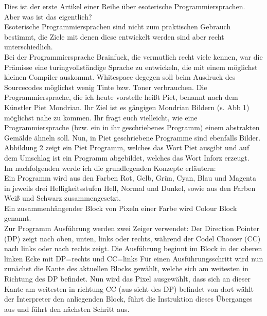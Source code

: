 {Dies ist der erste Artikel einer Reihe über esoterische Programmiersprachen.\\
Aber was ist das eigentlich?\\
Esoterische
Programmiersprachen sind nicht zum praktischen Gebrauch bestimmt, die Ziele
mit denen diese entwickelt werden sind aber recht unterschiedlich.\\
Bei der
Programmiersprache \glqq{}Brainfuck\grqq{}, die vermutlich recht viele kennen, war die Prämisse
eine turingvollständige Sprache zu entwickeln, die mit einem möglichst kleinen
Compiler auskommt. \glqq{}Whitespace\grqq{} degegen soll beim Ausdruck des
Sourcecodes möglichst wenig Tinte bzw. Toner verbrauchen.}
{Die Programmiersprache, die ich heute vorstelle heißt \glqq{}Piet\grqq{}, benannt nach dem
Künstler Piet Mondrian. Ihr Ziel ist es gängigen Mondrian Bildern (s.
Abb 1) möglichst nahe zu kommen.
 Ihr fragt euch vielleicht, wie eine Programmiersprache (bzw. ein in ihr geschriebenes Programm) einem abstrakten
Gemälde ähneln soll.
Nun, in Piet geschriebene Programme sind ebenfalls Bilder.
Abbildung 2 zeigt ein Piet Programm, welches das Wort \glqq{}Piet\grqq{} ausgibt und auf
dem Umschlag ist ein Programm abgebildet, welches das Wort \glqq{}Inforz\grqq{}
erzeugt.
~\\

Im nachfolgenden werde ich die grundlegenden Konzepte erläutern:\\

Ein Programm wird aus den Farben Rot, Gelb, Grün, Cyan, Blau und Magenta
  in jeweils drei Helligkeitsstufen Hell, Normal und Dunkel, sowie aus den
  Farben Weiß und Schwarz zusammengesetzt.\\

Ein zusammenhängender Block von Pixeln einer Farbe wird \glqq{}Colour Block\grqq{}
  genannt.\\

Zur Programm Ausführung werden zwei Zeiger verwendet: Der \glqq{}Direction Pointer\grqq{}
  (DP)
  zeigt nach oben, unten, links oder rechts, während der \glqq{}Codel Chooser\grqq{} (CC) nach
  links oder nach rechts zeigt.
  Die Ausführung beginnt im Block in der oberen linken Ecke mit DP=rechts und
  CC=links
  Für einen Ausführungsschritt wird nun zunächst die Kante des aktuellen
  Blocks gewählt, welche sich am weitesten in Richtung des DP befindet.
  Nun wird das Pixel ausgewählt, dass sich an dieser Kante am weitesten in
  richtung CC (\grqq{}aus sicht des DP\grqq{}) befindet von dort wählt der Interpreter den
  anliegenden Block, führt die Instruktion dieses Überganges aus und führt den
  nächsten Schritt aus.\\

}
